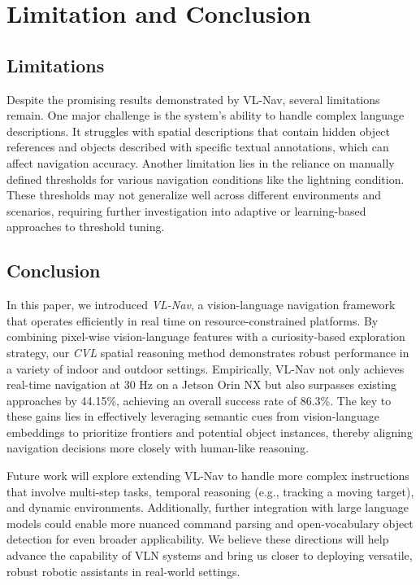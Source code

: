 \section{Limitation and Conclusion}
\label{sec:limitation_conclusion}

\subsection{Limitations}
\label{sec:limitation}
Despite the promising results demonstrated by VL-Nav, several limitations remain. One major challenge is the system's ability to handle complex language descriptions. It struggles with spatial descriptions that contain hidden object references and objects described with specific textual annotations, which can affect navigation accuracy. 
Another limitation lies in the reliance on manually defined thresholds for various navigation conditions like the lightning condition. These thresholds may not generalize well across different environments and scenarios, requiring further investigation into adaptive or learning-based approaches to threshold tuning.

\subsection{Conclusion}
\label{sec:conclusion}
In this paper, we introduced \emph{VL-Nav}, a vision-language navigation framework that operates efficiently in real time on resource-constrained platforms. By combining pixel-wise vision-language features with a curiosity-based exploration strategy, our \emph{CVL} spatial reasoning method demonstrates robust performance in a variety of indoor and outdoor settings. Empirically, VL-Nav not only achieves real-time navigation at 30 Hz on a Jetson Orin NX but also surpasses existing approaches by 44.15\%, achieving an overall success rate of 86.3\%. The key to these gains lies in effectively leveraging semantic cues from vision-language embeddings to prioritize frontiers and potential object instances, thereby aligning navigation decisions more closely with human-like reasoning.

Future work will explore extending VL-Nav to handle more complex instructions that involve multi-step tasks, temporal reasoning (e.g., tracking a moving target), and dynamic environments. Additionally, further integration with large language models could enable more nuanced command parsing and open-vocabulary object detection for even broader applicability. We believe these directions will help advance the capability of VLN systems and bring us closer to deploying versatile, robust robotic assistants in real-world settings.

